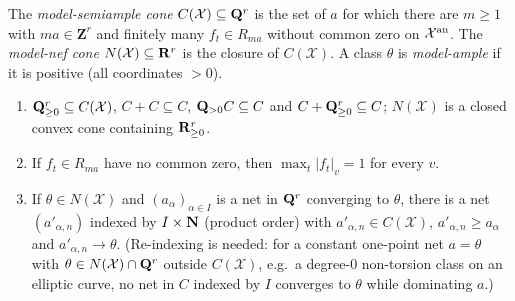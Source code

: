 \begin{definition}\label{def:gl-cones}
\leanok
{}
The \emph{model-semiample cone} $C(\mathcal X)\subseteq\mathbf{Q}^r$ is the set of $a$ for which there are $m\ge1$ with $ma\in\mathbf Z^r$ and
finitely many $f_t\in R_{ma}$ without common zero on $\mathcal X^{\mathrm{an}}$. The \emph{model-nef cone} $N(\mathcal X)\subseteq\mathbf{R}^r$ is the
closure of $C(\mathcal X)$. A class $\theta$ is \emph{model-ample} if it is positive (all coordinates $>0$).
\end{definition}

\begin{lemma}\label{lem:gl-cones}
\leanok
{}
\begin{enumerate}
\item $\mathbf{Q}^r_{\ge0}\subseteq C(\mathcal X)$, $C+C\subseteq C$, $\mathbf{Q}_{>0}C\subseteq C$ and $C+\mathbf{Q}^r_{\ge0}\subseteq C$; $N(\mathcal X)$ is a closed convex
cone containing $\mathbf{R}^r_{\ge0}$.
\item If $f_t\in R_{ma}$ have no common zero, then $\max_t|f_t|_v=1$ for every $v$.
\item If $\theta\in N(\mathcal X)$ and $(a_\alpha)_{\alpha\in I}$ is a net in $\mathbf{Q}^r$ converging to $\theta$, there is a net $(a'_{\alpha,n})$ indexed by $I\times\mathbf{N}$
(product order) with $a'_{\alpha,n}\in C(\mathcal X)$, $a'_{\alpha,n}\ge a_\alpha$ and $a'_{\alpha,n}\to\theta$. (Re-indexing is needed: for a constant one-point net
$a=\theta$ with $\theta\in N(\mathcal X)\cap\mathbf{Q}^r$ outside $C(\mathcal X)$, e.g.\ a degree-$0$ non-torsion class on an elliptic curve, no net in $C$ indexed by $I$
converges to $\theta$ while dominating $a$.)
\end{enumerate}
\end{lemma}

